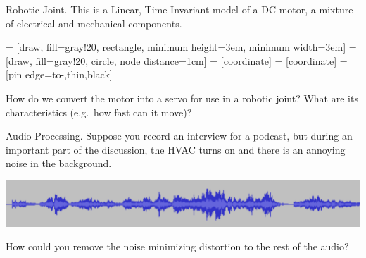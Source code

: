 \begin{example} Robotic Joint. This is a Linear, Time-Invariant model of a DC motor, a mixture of electrical and mechanical components.

  \begin{center}
     = [draw, fill=gray!20, rectangle, 
      minimum height=3em, minimum width=3em]
     = [draw, fill=gray!20, circle, node distance=1cm]
     = [coordinate]
     = [coordinate]
     = [pin edge={to-,thin,black}]

  \end{center}
  
  How do we convert the motor into a servo for use in a robotic joint? What are its characteristics (e.g.\ how fast can it move)?
\end{example}

\begin{example} Audio Processing. Suppose you record an interview for a podcast, but during an important part of the discussion, the HVAC turns on and there is an annoying noise in the background.

  \begin{center}
    \includegraphics[scale=0.5]{graphics/noisysignal.pdf}
  \end{center}

  How could you remove the noise minimizing distortion to the rest of the audio?
\end{example}


